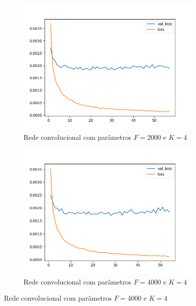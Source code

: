 \begin{figure}[H]
\begin{subfigure}{.5\textwidth}
  \label{fig:cnn-1000-k-4}
\end{subfigure}
\begin{subfigure}{.5\textwidth}
  \centering
  \caption{Rede convolucional com parâmetros $F = 2000$ e $K = 4$}
  \includegraphics[width=.8\linewidth]{figuras/ape-ajustes-hiper-parametros/cnn-2000-k-4.png}
  
  \label{fig:cnn-2000-k-4}
\end{subfigure}
\begin{subfigure}{.5\textwidth}
  \centering
  \caption{Rede convolucional com parâmetros $F = 4000$ e $K = 4$}
  \includegraphics[width=.8\linewidth]{figuras/ape-ajustes-hiper-parametros/cnn-4000-k-4.png}
  
  \label{fig:cnn-4000-k-4}
\end{subfigure}
\label{fig:treinamento-cnn-diferentes-kernels-2}
\end{figure}


